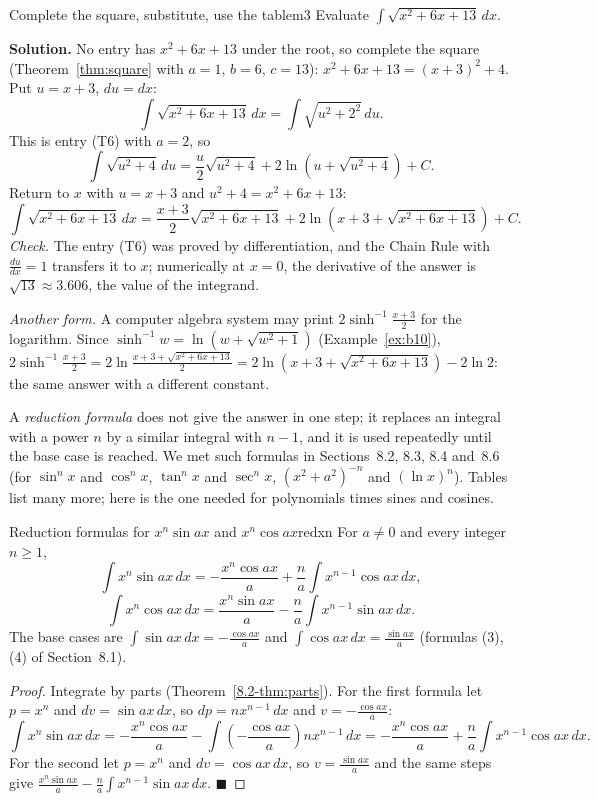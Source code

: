 \documentclass[11pt]{article}
\begin{document}
\begin{exmp}{Complete the square, substitute, use the table}{m3}
Evaluate $\displaystyle\int\sqrt{x^2+6x+13}\,dx$.

\textbf{Solution.} No entry has $x^2+6x+13$ under the root, so complete the square (Theorem~\ref{thm:square} with $a=1$, $b=6$, $c=13$): $x^2+6x+13=(x+3)^2+4$. Put $u=x+3$, $du=dx$:
\[\int\sqrt{x^2+6x+13}\,dx=\int\sqrt{u^2+2^2}\,du .\]
This is entry (T6) with $a=2$, so
\[\int\sqrt{u^2+4}\,du=\frac u2\sqrt{u^2+4}+2\ln\left(u+\sqrt{u^2+4}\right)+C .\]
Return to $x$ with $u=x+3$ and $u^2+4=x^2+6x+13$:
\[\int\sqrt{x^2+6x+13}\,dx=\frac{x+3}2\sqrt{x^2+6x+13}+2\ln\left(x+3+\sqrt{x^2+6x+13}\right)+C .\]
\emph{Check.} The entry (T6) was proved by differentiation, and the Chain Rule with $\frac{du}{dx}=1$ transfers it to $x$; numerically at $x=0$, the derivative of the answer is $\sqrt{13}\approx3.606$, the value of the integrand.

\emph{Another form.} A computer algebra system may print $2\sinh^{-1}\frac{x+3}2$ for the logarithm. Since $\sinh^{-1}w=\ln\left(w+\sqrt{w^2+1}\right)$ (Example~\ref{ex:b10}), $2\sinh^{-1}\frac{x+3}2=2\ln\frac{x+3+\sqrt{x^2+6x+13}}2=2\ln\left(x+3+\sqrt{x^2+6x+13}\right)-2\ln2$: the same answer with a different constant.
\end{exmp}

A \emph{reduction formula} does not give the answer in one step; it replaces an integral with a power $n$ by a similar integral with $n-1$, and it is used repeatedly until the base case is reached. We met such formulas in Sections~8.2, 8.3, 8.4 and~8.6 (for $\sin^nx$ and $\cos^nx$, $\tan^nx$ and $\sec^nx$, $(x^2+a^2)^{-n}$ and $(\ln x)^n$). Tables list many more; here is the one needed for polynomials times sines and cosines.

\begin{thm}{Reduction formulas for $x^n\sin ax$ and $x^n\cos ax$}{redxn}
For $a\ne0$ and every integer $n\ge1$,
\[\int x^n\sin ax\,dx=-\frac{x^n\cos ax}a+\frac na\int x^{n-1}\cos ax\,dx,\]
\[\int x^n\cos ax\,dx=\frac{x^n\sin ax}a-\frac na\int x^{n-1}\sin ax\,dx .\]
The base cases are $\int\sin ax\,dx=-\frac{\cos ax}a$ and $\int\cos ax\,dx=\frac{\sin ax}a$ (formulas (3), (4) of Section~8.1).
\end{thm}
\begin{proof}
Integrate by parts (Theorem~\ref{8.2-thm:parts}). For the first formula let $p=x^n$ and $dv=\sin ax\,dx$, so $dp=nx^{n-1}\,dx$ and $v=-\frac{\cos ax}a$:
\[\int x^n\sin ax\,dx=-\frac{x^n\cos ax}a-\int\left(-\frac{\cos ax}a\right)nx^{n-1}\,dx=-\frac{x^n\cos ax}a+\frac na\int x^{n-1}\cos ax\,dx.\]
For the second let $p=x^n$ and $dv=\cos ax\,dx$, so $v=\frac{\sin ax}a$ and the same steps give $\frac{x^n\sin ax}a-\frac na\int x^{n-1}\sin ax\,dx$. $\blacksquare$
\end{proof}
\end{document}
